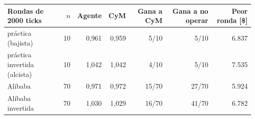\begin{tabular}{lrrrrrr}
\toprule
Rondas de 2000 ticks & $n$ & Agente & CyM & Gana a CyM & Gana a no operar & Peor ronda [\$] \\
\midrule
práctica (bajista) & 10 & 0,961 & 0,959 & 5/10 & 5/10 & 6.837 \\
práctica invertida (alcista) & 10 & 1,042 & 1,042 & 4/10 & 5/10 & 7.535 \\
Alibaba & 70 & 0,971 & 0,972 & 15/70 & 27/70 & 5.924 \\
Alibaba invertida & 70 & 1,030 & 1,029 & 16/70 & 41/70 & 6.782 \\
\bottomrule
\end{tabular}

